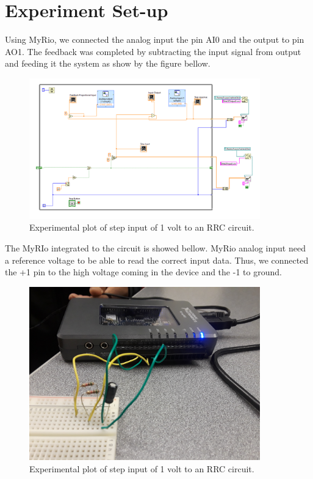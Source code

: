 \documentclass[12pt,letterpaper]{article}
\begin{document}
\section*{Experiment Set-up}
Using MyRio, we connected the analog input the pin AI0 and the output
to pin AO1. The feedback was completed by subtracting the input signal
from output and feeding it the system as show by the figure bellow.\\
\begin{figure}[h]
    \centering
    \includegraphics[width=10cm]{Capture.png}
    \caption{Experimental plot of step input of 1 volt to an RRC circuit.}
\end{figure}

The MyRIo integrated to the circuit is showed bellow. MyRio analog input need 
a reference voltage to be able to read the correct input data. Thus, we connected
the +1 pin to the high voltage coming in the device and the -1 to ground.
\begin{figure}[h]
    \centering
    \includegraphics[width=10cm]{20190224_134224.jpg}
    \caption{Experimental plot of step input of 1 volt to an RRC circuit.}
\end{figure}   
\end{document}
